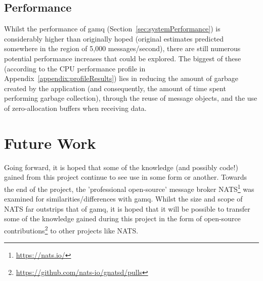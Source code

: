 \subsection{Performance}
\label{sub:performance}

Whilst the performance of gamq (Section~\ref{sec:systemPerformance}) is
considerably higher than originally hoped (original estimates predicted
somewhere in the region of 5,000 messages/second), there are still numerous
potential performance increases that could be explored. The biggest of these
(according to the CPU performance profile in
Appendix~\ref{appendix:profileResults}) lies in reducing the amount of garbage
created by the application (and consequently, the amount of time spent
performing garbage collection), through the reuse of message objects, and the
use of zero-allocation buffers \cite{highPerformanceSystemsInGo} when receiving
data.

\section{Future Work}
\label{sec:Future Work}

Going forward, it is hoped that some of the knowledge (and possibly code!) gained
from this project continue to see use in some form or another. Towards the end
of the project, the 'professional open-source' message broker
NATS\footnote{\url{https://nats.io/}} was examined for similarities/differences
with gamq. Whilst the size and scope of NATS far outstrips that of gamq, it is
hoped that it will be possible to transfer some of the knowledge gained during
this project in the form of open-source
contributions\footnote{\url{https://github.com/nats-io/gnatsd/pulls}}
to other projects like NATS.
